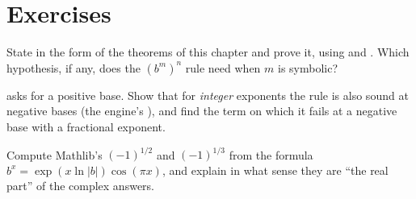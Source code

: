 \section{Exercises}

\begin{exercisebox}
  State  in the form of the theorems of this chapter and prove it,
  using  and . Which hypothesis, if any, does the
  $(b^m)^n$ rule need when $m$ is symbolic?
\end{exercisebox}

\begin{exercisebox}
   asks for a positive base. Show that for \emph{integer}
  exponents the rule is also sound at negative bases (the engine's ), and find the term on which it fails at a
  negative base with a fractional exponent.
\end{exercisebox}

\begin{exercisebox}
  Compute Mathlib's $(-1)^{1/2}$ and $(-1)^{1/3}$ from the formula
  $b^x = \exp(x \ln|b|)\cos(\pi x)$, and explain in what sense they are ``the real part'' of the
  complex answers.
\end{exercisebox}
